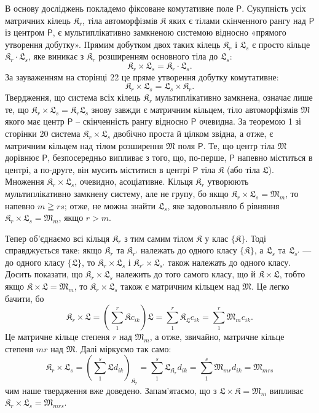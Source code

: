 \documentclass[11pt]{article}
\begin{document}
В основу досліджень покладемо фіксоване комутативне поле \(\mathsf P\). Сукупність усіх матричних кілець \(\mathfrak K_r\), тіла автоморфізмів \(\mathfrak K\) яких є тілами скінченного рангу над \(\mathsf P\) із центром \(\mathsf P\), є мультиплікативно замкненою системою відносно «прямого утворення добутку». Прямим добутком двох таких кілець \(\mathfrak K_r\) і \(\mathfrak L_s\) є просто кільце \(\mathfrak K_r\cdot\mathfrak L_s\), яке виникає з \(\mathfrak K_r\) розширенням основного тіла до \(\mathfrak L_s\):
\[
\mathfrak K_r\times\mathfrak L_s=\mathfrak K_r\cdot\mathfrak L_s.
\]
За зауваженням на сторінці 22 це пряме утворення добутку комутативне:
\[
\mathfrak K_r\times\mathfrak L_s=\mathfrak L_s\times\mathfrak K_r.
\]
Твердження, що система всіх кілець \(\mathfrak K_r\) мультиплікативно замкнена, означає лише те, що \(\mathfrak K_r\times\mathfrak L_s=\mathfrak K_r\mathfrak L_s\) знову завжди є матричним кільцем, тіло автоморфізмів \(\mathfrak M\) якого має центр \(\mathsf P\) -- скінченність рангу відносно \(\mathsf P\) очевидна. За теоремою 1 зі сторінки 20 система \(\mathfrak K_r\times\mathfrak L_s\) двобічно проста й цілком звідна, а отже, є матричним кільцем над тілом розширення \(\mathfrak M\) поля \(\mathsf P\). Те, що центр тіла \(\mathfrak M\) дорівнює \(\mathsf P\), безпосередньо випливає з того, що, по-перше, \(\mathsf P\) напевно міститься в центрі, а по-друге, він мусить міститися в центрі \(\mathsf P\) тіла \(\mathfrak K\) (або тіла \(\mathfrak L\)). Множення \(\mathfrak K_r\times\mathfrak L_s\), очевидно, асоціативне. Кільця \(\mathfrak K_r\) утворюють мультиплікативно замкнену систему, але не групу, бо якщо \(\mathfrak K_r\times\mathfrak L_s=\mathfrak M_m\), то напевно \(m\geqq rs\); отже, не можна знайти \(\mathfrak L_s\), яке задовольняло б рівняння \(\mathfrak K_r\times\mathfrak L_s=\mathfrak M_m\), якщо \(r>m\).

Тепер об'єднаємо всі кільця \(\mathfrak K_r\) з тим самим тілом \(\mathfrak K\) у клас \(\{\mathfrak K\}\). Тоді справджується таке: якщо \(\mathfrak K_r\) та \(\mathfrak K_{r'}\) належать до одного класу \(\{\mathfrak K\}\), а \(\mathfrak L_s\) та \(\mathfrak L_{s'}\) --- до одного класу \(\{\mathfrak L\}\), то \(\mathfrak K_r\times\mathfrak L_s\) і \(\mathfrak K_{r'}\times\mathfrak L_{s'}\) також належать до одного класу. Досить показати, що \(\mathfrak K_r\times\mathfrak L_s\) належить до того самого класу, що й \(\mathfrak K\times\mathfrak L\), тобто якщо \(\mathfrak K\times\mathfrak L=\mathfrak M_m\), то \(\mathfrak K_r\times\mathfrak L_s\) також є матричним кільцем над \(\mathfrak M\). Це легко бачити, бо
\[
\mathfrak K_r\times\mathfrak L
=\left(\sum_1^r\mathfrak K c_{ik}\right)\mathfrak L
=\sum_1^r\mathfrak K_{\mathfrak L}c_{ik}
=\sum_1^r\mathfrak M_m c_{ik}.
\]
Це матричне кільце степеня \(r\) над \(\mathfrak M_m\), а отже, звичайно, матричне кільце степеня \(mr\) над \(\mathfrak M\). Далі міркуємо так само:
\[
\mathfrak K_r\times\mathfrak L_s
=\left(\sum_1^s\mathfrak L d_{ik}\right)_{\mathfrak K_r}
=\sum_1^s\mathfrak L_{\mathfrak K_r}d_{ik}
=\sum_1^s\mathfrak M_{mr}d_{ik}
=\mathfrak M_{mrs}
\]
чим наше твердження вже доведено. Запам'ятаємо, що з \(\mathfrak L\times\mathfrak K=\mathfrak M_m\) випливає \(\mathfrak K_r\times\mathfrak L_s=\mathfrak M_{mrs}\).
\end{document}
